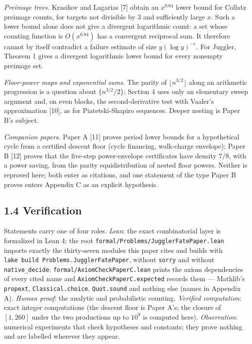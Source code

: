 \documentclass[11pt,a4paper]{article}
\begin{document}
\emph{Preimage trees.} Krasikov and Lagarias {[}7{]} obtain an
\(x^{0.84}\) lower bound for Collatz preimage counts, for targets not
divisible by \(3\) and sufficiently large \(x\). Such a lower bound
alone does not give a divergent logarithmic count: a set whose counting
function is \(O(x^{0.84})\) has a convergent reciprocal sum. It
therefore cannot by itself contradict a failure estimate of size
\(y(\log y)^{-e}\). For Juggler, Theorem 1 gives a divergent logarithmic
lower bound for every nonempty preimage set.

\emph{Floor-power maps and exponential sums.} The parity of
\(\lfloor n^{3/2}\rfloor\) along an arithmetic progression is a question
about \(\{n^{3/2}/2\}\); Section 4 uses only an elementary sweep
argument and, on even blocks, the second-derivative test with Vaaler's
approximation {[}10{]}, as for Piatetski-Shapiro sequences. Deeper
nesting is Paper B's subject.

\emph{Companion papers.} Paper A {[}11{]} proves period lower bounds for
a hypothetical cycle from a certified descent floor (cycle financing,
walk-charge envelope); Paper B {[}12{]} proves that the five-step
power-envelope certificates have density \(7/8\), with a power saving,
from the parity equidistribution of nested floor powers. Neither is
reproved here; both enter as citations, and one statement of the type
Paper B proves enters Appendix C as an explicit hypothesis.

\subsection{1.4 Verification}\label{verification}

Statements carry one of four roles. \emph{Lean}: the exact combinatorial
layer is formalized in Lean 4; the root
\texttt{\nolinkurl{formal/Problems/JugglerFatePaper.lean}} imports
exactly the thirty-seven modules this paper cites and builds with
\texttt{lake\ build\ Problems.JugglerFatePaper}, without
\texttt{\nolinkurl{sorry}} and without
\texttt{\nolinkurl{native_decide}};
\texttt{\nolinkurl{formal/AxiomCheckPaperC.lean}} prints the axiom
dependencies of every cited name and
\texttt{\nolinkurl{AxiomCheckPaperC.expected}} records them ---
Mathlib's \texttt{\nolinkurl{propext}},
\texttt{\nolinkurl{Classical.choice}}, \texttt{\nolinkurl{Quot.sound}}
and nothing else (names in Appendix A). \emph{Human proof}: the analytic
and probabilistic counting. \emph{Verified computation}: exact integer
computations (the descent floor is Paper A's; the closure of \([1,260]\)
under the two productions up to \(10^9\) is computed here).
\emph{Observation}: numerical experiments that check hypotheses and
constants; they prove nothing and are labelled wherever they appear.
\end{document}
